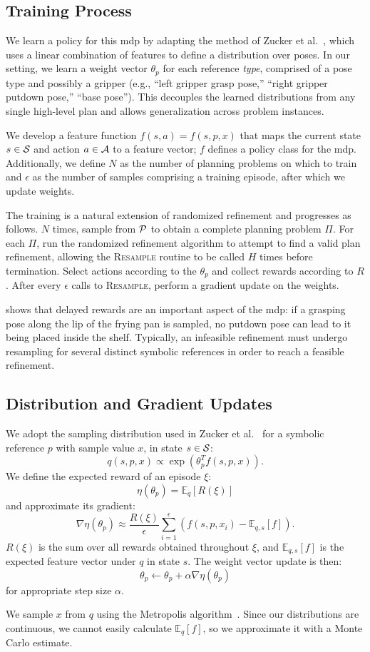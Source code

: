 \subsection{Training Process}
We learn a policy for this {\sc mdp} by adapting the method of Zucker et al.~\cite{workspacebias}, which
uses a linear combination of features to define a distribution over poses. In our setting, we learn a weight
vector $\theta_{p}$ for each reference \emph{type}, comprised of a pose type and possibly a gripper
(e.g., ``left gripper grasp pose,'' ``right gripper putdown pose,'' ``base pose'').
This decouples the learned distributions from any single high-level plan and allows generalization across problem instances.

We develop a feature function $f(s, a) = f(s, p, x)$ that maps the current
state $s \in \mathcal{S}$ and action $a \in \mathcal{A}$ to a
feature vector; $f$ defines a policy class for the {\sc mdp}. Additionally, we define
$N$ as the number of planning problems on which to train and
$\epsilon$ as the number of samples comprising a training episode, after which we update weights.

The training is a natural extension of randomized
refinement and progresses as follows. $N$ times, sample from $\mathcal{P}$ to obtain
a complete planning problem $\Pi$. For each $\Pi$, run the randomized refinement
algorithm to attempt to find a valid plan refinement, allowing the \textsc{Resample}
routine to be called $H$ times before termination. Select actions according to the $\theta_{p}$
and collect rewards according to $R$. After every $\epsilon$ calls to
\textsc{Resample}, perform a gradient update on the weights.

 shows that delayed rewards are an important
aspect of the {\sc mdp}: if a grasping pose along the lip of the frying pan is sampled, no putdown pose can lead
to it being placed inside the shelf. Typically, an infeasible refinement must undergo
resampling for several distinct symbolic references in order to reach a feasible refinement.

\subsection{Distribution and Gradient Updates}
We adopt the sampling distribution used in Zucker et al.~\cite{workspacebias}
for a symbolic reference $p$ with sample value $x$, in state $s \in \mathcal{S}$:
$$q(s, p, x) \propto \exp(\theta_{p}^{T} f(s, p, x)).$$
We define the expected reward of an episode $\xi$:
$$\eta(\theta_{p}) = \mathbb{E}_{q}[R(\xi)]$$ and approximate its gradient:
$$\nabla \eta(\theta_{p}) \approx \frac{R(\xi)}{\epsilon} \sum_{i=1}^{\epsilon}(f(s, p, x_{i}) - \mathbb{E}_{q,s}[f]).$$
$R(\xi)$ is the sum over all rewards obtained throughout $\xi$, and
$\mathbb{E}_{q,s}[f]$ is the expected feature vector under $q$ in state $s$. The weight vector update is then:
$$\theta_{p} \leftarrow \theta_{p} + \alpha \nabla \eta(\theta_{p})$$
for appropriate step size $\alpha$.

We sample $x$ from $q$ using the Metropolis algorithm~\cite{chib1995understanding}.
Since our distributions are continuous, we cannot easily calculate $\mathbb{E}_{q}[f]$,
so we approximate it with a Monte Carlo estimate.